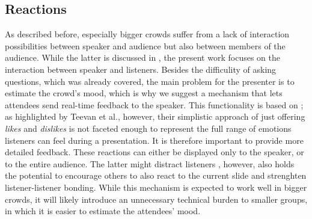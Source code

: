 \subsection{Reactions}
As described before, especially bigger crowds suffer from a lack of interaction possibilities between speaker and audience but also between members of the audience. While the latter is discussed in \cite{Bry:Backstage}, the present work focuses on the interaction between speaker and listeners. Besides the difficulity of asking questions, which was already covered, the main problem for the presenter is to estimate the crowd's mood, which is why we suggest a mechanism that lets attendees send real-time feedback to the speaker. This functionality is based on \cite{Teevan:MobileFeedbackDuringPresentation}; as highlighted by Teevan et al., however, their simplistic approach of just offering \emph{likes} and \emph{dislikes} is not faceted enough to represent the full range of emotions listeners can feel during a presentation. It is therefore important to provide more detailed feedback.
These reactions can either be displayed only to the speaker, or to the entire audience. The latter might distract listeners \cite{Teevan:MobileFeedbackDuringPresentation}, however, also holds the potential to encourage others to also react to the current slide and strenghten listener-listener bonding. While this mechanism is expected to work well in bigger crowds, it will likely introduce an unnecessary technical burden to smaller groups, in which it is easier to estimate the attendees' mood. 

